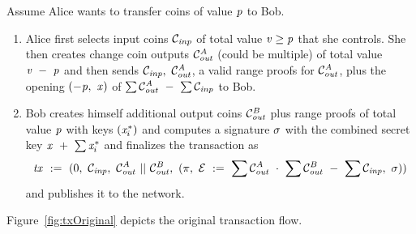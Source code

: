 Assume Alice wants to transfer coins of value $\mathit{p}$ to Bob.
\begin{enumerate}
    \item Alice first selects input coins $\mathcal{C}_{\mathit{inp}}$ of total value $\mathit{v} \geq \mathit{p}$  that she controls. She then creates change coin outputs $\mathcal{C}_{\mathit{out}}^{\mathit{A}}$ (could be multiple) of total value $\mathit{v} ~-~ \mathit{p}$ and then
    sends $\mathcal{C}_{\mathit{inp}} ,~ \mathcal{C}_{\mathit{out}}^{\mathit{A}}$, a valid range proofs for $\mathcal{C}_{\mathit{out}}^{\mathit{A}}$, plus the opening $(-\mathit{p} ,~ \mathit{x})$ of $\sum{\mathcal{C}_{\mathit{out}}^{\mathit{A}}} ~-~ \sum{\mathcal{C}_{\mathit{inp}}}$ to Bob.
    \item Bob creates himself additional output coins $\mathcal{C}_{\mathit{out}}^B$ plus range proofs of total value $\mathit{p}$ with keys $(\mathit{x}^*_i)$ and computes a signature $\sigma$ with the combined secret key $\mathit{x} ~+~ \sum{\mathit{x}^*_i}$ 
    and finalizes the transaction as
    \[ \mathit{tx} ~:=~ (0 ,~ \mathcal{C}_{\mathit{inp}} ,~ \mathcal{C}_{\mathit{out}}^A ~||~ \mathcal{C}_{\mathit{out}}^B ,~ (\pi ,~ \mathcal{E} ~:=~ \sum{\mathcal{C}_{\mathit{out}}^A} ~\cdot~ \sum{\mathcal{C}_{\mathit{out}}^B} ~-~ \sum{\mathcal{C}_{\mathit{inp}}} ,~ \sigma)) \]
    and publishes it to the network.
\end{enumerate}
Figure~\ref{fig:txOriginal} depicts the original transaction flow.\\
